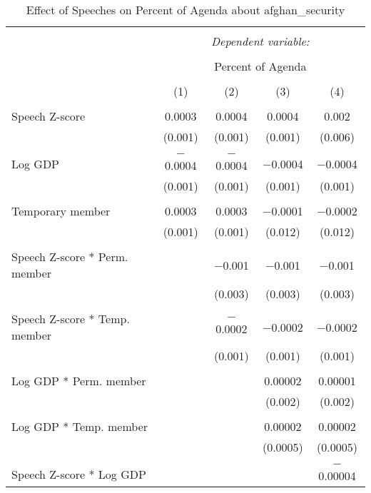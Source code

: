 
\begin{table}[!htbp] \centering 
  \caption{Effect of Speeches on Percent of Agenda about afghan_security} 
  \label{} 
\begin{tabular}{@{\extracolsep{5pt}}lcccc} 
\\[-1.8ex]\hline 
\hline \\[-1.8ex] 
 & \multicolumn{4}{c}{\textit{Dependent variable:}} \\ 
\cline{2-5} 
\\[-1.8ex] & \multicolumn{4}{c}{Percent of Agenda} \\ 
\\[-1.8ex] & (1) & (2) & (3) & (4)\\ 
\hline \\[-1.8ex] 
 Speech Z-score & 0.0003 & 0.0004 & 0.0004 & 0.002 \\ 
  & (0.001) & (0.001) & (0.001) & (0.006) \\ 
  & & & & \\ 
 Log GDP & $-$0.0004 & $-$0.0004 & $-$0.0004 & $-$0.0004 \\ 
  & (0.001) & (0.001) & (0.001) & (0.001) \\ 
  & & & & \\ 
 Temporary member & 0.0003 & 0.0003 & $-$0.0001 & $-$0.0002 \\ 
  & (0.001) & (0.001) & (0.012) & (0.012) \\ 
  & & & & \\ 
 Speech Z-score * Perm. member &  & $-$0.001 & $-$0.001 & $-$0.001 \\ 
  &  & (0.003) & (0.003) & (0.003) \\ 
  & & & & \\ 
 Speech Z-score * Temp. member &  & $-$0.0002 & $-$0.0002 & $-$0.0002 \\ 
  &  & (0.001) & (0.001) & (0.001) \\ 
  & & & & \\ 
 Log GDP * Perm. member &  &  & 0.00002 & 0.00001 \\ 
  &  &  & (0.002) & (0.002) \\ 
  & & & & \\ 
 Log GDP * Temp. member &  &  & 0.00002 & 0.00002 \\ 
  &  &  & (0.0005) & (0.0005) \\ 
  & & & & \\ 
 Speech Z-score * Log GDP &  &  &  & $-$0.00004 \\ 

\end{tabular}
\end{table}
